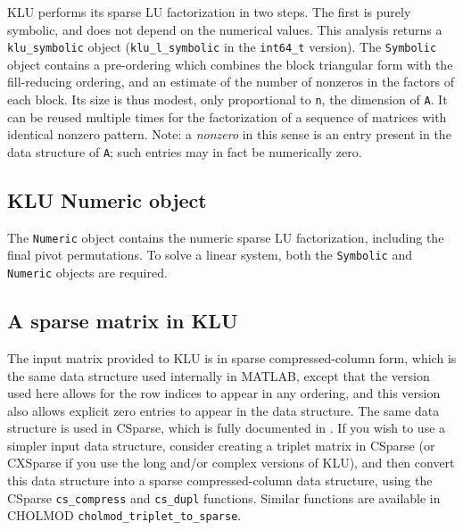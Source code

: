 \documentclass[11pt]{article}
\begin{document}
KLU performs its sparse LU factorization in two steps.  The first is purely
symbolic, and does not depend on the numerical values.  This analysis returns a
{\tt klu\_symbolic} object ({\tt klu\_l\_symbolic} in the \verb'int64_t'
version).  The {\tt Symbolic} object contains a pre-ordering which combines the
block triangular form with the fill-reducing ordering, and an estimate of the
number of nonzeros in the factors of each block.  Its size is thus modest, only
proportional to {\tt n}, the dimension of {\tt A}.  It can be reused multiple
times for the factorization of a sequence of matrices with identical nonzero
pattern.  Note: a {\em nonzero} in this sense is an entry present in the data
structure of {\tt A}; such entries may in fact be numerically zero.

\subsection{KLU Numeric object}

The {\tt Numeric} object contains the numeric sparse LU factorization, including
the final pivot permutations.  To solve a linear system, both the {\tt Symbolic}
and {\tt Numeric} objects are required.

\subsection{A sparse matrix in KLU}

The input matrix provided to KLU is in sparse compressed-column form, which is
the same data structure used internally in MATLAB, except that the version used
here allows for the row indices to appear in any ordering, and this version
also allows explicit zero entries to appear in the data structure.  The same
data structure is used in CSparse, which is fully documented in
\cite{Davis06book}.  If you wish to use a simpler input data structure,
consider creating a triplet matrix in CSparse (or CXSparse if you use the long
and/or complex versions of KLU), and then convert this data structure into a
sparse compressed-column data structure, using the CSparse {\tt cs\_compress}
and {\tt cs\_dupl} functions.  Similar functions are available in CHOLMOD
{\tt cholmod\_triplet\_to\_sparse}.
\end{document}
